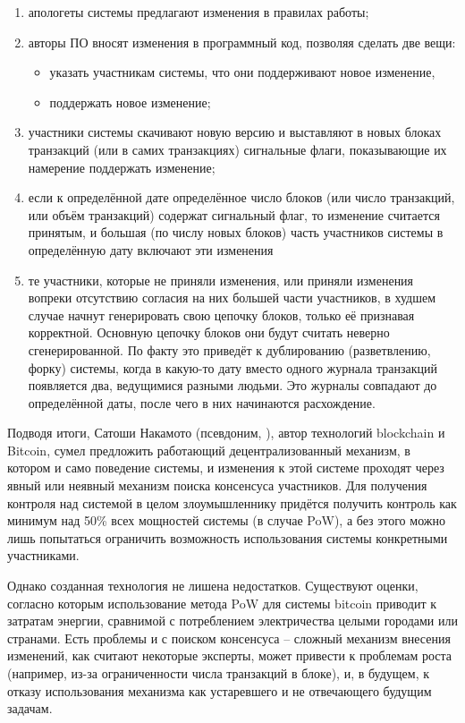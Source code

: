 \begin{enumerate}
	\item апологеты системы предлагают изменения в правилах работы;
	\item авторы ПО вносят изменения в программный код, позволяя сделать две вещи:
	\begin{itemize}
		\item указать участникам системы, что они поддерживают новое изменение,
		\item поддержать новое изменение;
	\end{itemize}
	\item участники системы скачивают новую версию и выставляют в новых блоках транзакций (или в самих транзакциях) сигнальные флаги, показывающие их намерение поддержать изменение;
	\item если к определённой дате определённое число блоков (или число транзакций, или объём транзакций) содержат сигнальный флаг, то изменение считается принятым, и большая (по числу новых блоков) часть участников системы в определённую дату включают эти изменения
	\item те участники, которые не приняли изменения, или приняли изменения вопреки отсутствию согласия на них большей части участников, в худшем случае начнут генерировать свою цепочку блоков, только её признавая корректной. Основную цепочку блоков они будут считать неверно сгенерированной. По факту это приведёт к дублированию (разветвлению, форку) системы, когда в какую-то дату вместо одного журнала транзакций появляется два, ведущимися разными людьми. Это журналы совпадают до определённой даты, после чего в них начинаются расхождение.
\end{enumerate}

Подводя итоги, Сатоши Накамото (псевдоним, ), автор технологий blockchain и Bitcoin, сумел предложить работающий децентрализованный механизм, в котором и само поведение системы, и изменения к этой системе проходят через явный или неявный механизм поиска консенсуса участников. Для получения контроля над системой в целом злоумышленнику придётся получить контроль как минимум над 50\% всех мощностей системы (в случае PoW), а без этого можно лишь попытаться ограничить возможность использования системы конкретными участниками.

Однако созданная технология не лишена недостатков. Существуют оценки, согласно которым использование метода PoW для системы bitcoin приводит к затратам энергии, сравнимой с потреблением электричества целыми городами или странами. Есть проблемы и с поиском консенсуса -- сложный механизм внесения изменений, как считают некоторые эксперты, может привести к проблемам роста (например, из-за ограниченности числа транзакций в блоке), и, в будущем, к отказу использования механизма как устаревшего и не отвечающего будущим задачам.

